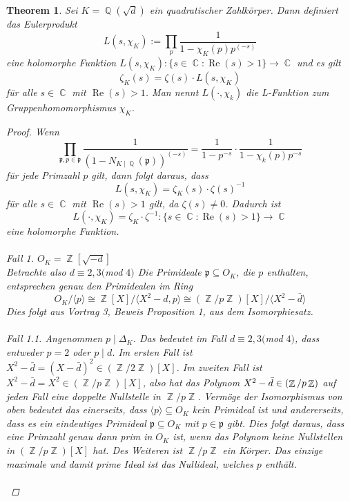 \documentclass[10pt,a4paper]{article}
\theoremstyle{plain}
\newtheorem{thm}{Theorem}[section]
\theoremstyle{definition}
\theoremstyle{remark}
\DeclareMathOperator{\C}{\mathbb{C}}
\DeclareMathOperator{\Q}{\mathbb{Q}}
\DeclareMathOperator{\Z}{\mathbb{Z}}
\DeclareMathOperator{\re}{Re}
\begin{document}
\begin{thm}

Sei $K=\Q(\sqrt{d})$ ein quadratischer Zahlkörper. Dann definiert das Eulerprodukt $$L(s,\chi_K) := \prod_{p}\frac{1}{1-\chi_K(p)p^{(-s)}} $$ eine holomorphe Funktion $L(s,\chi_K) \colon \{s \in \C \colon \re(s) > 1\} \rightarrow \C$ und es gilt $$\zeta_K(s) = \zeta(s)\cdot L(s,\chi_K) $$ für alle $s \in \C $ mit $ \re(s) > 1$. Man nennt $L(\cdot,\chi_k)$ die L-Funktion zum Gruppenhomomorphismus $\chi_K$.

\begin{proof}

Wenn $$\prod_{\mathfrak{p},p \in \mathfrak{p}}\frac{1}{(1- N_{K\mid \Q}(\mathfrak{p}))^{(-s)}}= \frac{1}{1-p^{-s}}\cdot\frac{1}{1-\chi_k(p)p^{-s}}$$ für jede Primzahl $p$ gilt, dann folgt daraus, dass $$L(s,\chi_K)= \zeta_K(s)\cdot \zeta(s)^{-1}$$ für alle $s \in \C $ mit $ \re(s)>1$ gilt, da $\zeta(s) \neq 0$. Dadurch ist $$L(\cdot,\chi_K)= \zeta_K\cdot \zeta^{-1}\colon \{s \in \C \colon \re(s)>1\}\rightarrow \C$$ eine holomorphe Funktion.
\\
\\
\textit{Fall 1.}
$O_K= \Z[\sqrt{-d}]$ \\
Betrachte also $d\equiv2,3 ($mod $ 4)$
Die Primideale $\mathfrak{p} \subseteq O_K$, die $p$ enthalten, entsprechen genau den Primidealen im Ring $$O_K /\langle p\rangle \cong \Z[X] /\langle X^2-d,p\rangle \cong (\Z/p\Z)[X]/\langle X^2-\bar{d}\rangle$$  Dies folgt aus Vortrag 3, Beweis Proposition 1, aus dem Isomorphiesatz.
\\
\\
\textit{Fall 1.1.}
Angenommen $p \mid \Delta_K$. Das bedeutet im Fall $d \equiv2,3 ($mod $ 4)$, dass entweder $p = 2$ oder $p \mid d$. Im ersten Fall ist $X^2-\bar{d} = (X-\bar{d})^2 \in (\Z/2\Z)[X]$.
Im zweiten Fall ist $X^2-\bar{d} = X^2 \in (\Z/p\Z)[X]$, also hat das Polynom $X^2-\bar{d} \\ \in (\Z/p\Z)$ auf jeden Fall eine doppelte Nullstelle in $\Z/p\Z$. Vermöge der Isomorphismus von oben bedeutet das einerseits, dass $\langle p\rangle \subseteq O_K$ kein Primideal ist und andererseits, dass es ein eindeutiges Primideal $\mathfrak{p} \subseteq O_K$ mit $p \in \mathfrak{p}$ gibt. Dies folgt daraus, dass eine Primzahl genau dann prim in $O_K$  ist, wenn das Polynom keine Nullstellen in $(\Z/p\Z)[X]$ hat. Des Weiteren ist $\Z/p\Z$ ein Körper. Das einzige maximale und damit prime Ideal ist das Nullideal, welches $p$ enthält.
\\
\\

\end{proof}
\end{thm}
\end{document}
